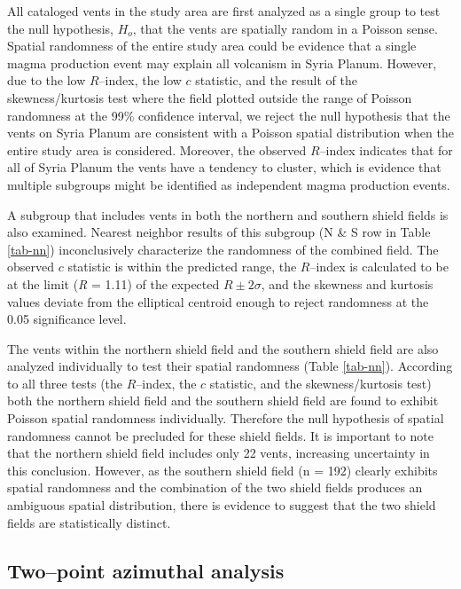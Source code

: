 All cataloged vents in the study area are first analyzed as a single group to test the null hypothesis, $H_o$, that the vents are spatially random in a Poisson sense. Spatial randomness of the entire study area could be evidence that a single magma production event may explain all volcanism in Syria Planum. However, due to the low $R$--index, the low $c$ statistic, and the result of the skewness/kurtosis test where the field plotted outside the range of Poisson randomness at the 99\% confidence interval, we reject the null hypothesis that the vents on Syria Planum are consistent with a Poisson spatial distribution when the entire study area is considered. Moreover, the observed $R$--index indicates that for all of Syria Planum the vents have a tendency to cluster, which is evidence that multiple subgroups might be identified as independent magma production events.

A subgroup that includes vents in both the northern and southern shield fields is also examined. Nearest neighbor results of this subgroup (N \& S row in Table \ref{tab-nn}) inconclusively characterize the randomness of the combined field. The observed $c$ statistic is within the predicted range, the $R$--index is calculated to be at the limit (\textit{R} = 1.11) of the expected $R \pm 2\sigma$, and the skewness and kurtosis values deviate from the elliptical centroid enough to reject randomness at the 0.05 significance level.

The vents within the northern shield field and the southern shield field are also analyzed individually to test their spatial randomness (Table \ref{tab-nn}). According to all three tests (the $R$--index, the $c$ statistic, and the skewness/kurtosis test) both the northern shield field and the southern shield field are found to exhibit Poisson spatial randomness individually. Therefore the null hypothesis of spatial randomness cannot be precluded for these shield fields. It is important to note that the northern shield field includes only 22 vents, increasing uncertainty in this conclusion. However, as the  southern shield field (n = 192) clearly exhibits spatial randomness and the combination of the two shield fields produces an ambiguous spatial distribution, there is evidence to suggest that the two shield fields are statistically distinct.

\subsection{Two--point azimuthal analysis}


